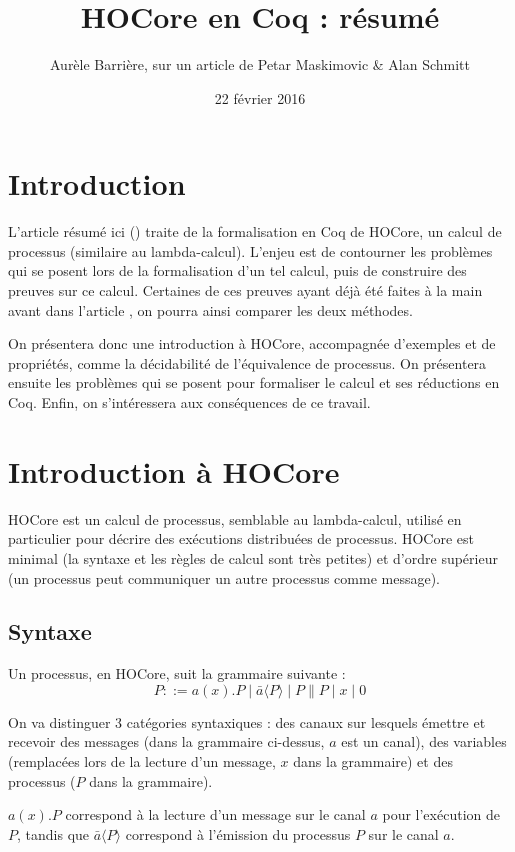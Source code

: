 \documentclass[11pt]{article}
\title{HOCore en Coq : résumé}
\date{22 février 2016}
\author{Aurèle Barrière, sur un article de Petar Maskimovic \& Alan Schmitt}
\begin{document}
\nocite{*}
\maketitle


\section{Introduction}
L'article résumé ici (\cite{hocoreincoq}) traite de la formalisation en Coq de HOCore, un calcul de processus (similaire au lambda-calcul). L'enjeu est de contourner les problèmes qui se posent lors de la formalisation d'un tel calcul, puis de construire des preuves sur ce calcul. Certaines de ces preuves ayant déjà été faites à la main avant dans l'article \cite{expressiveness}, on pourra ainsi comparer les deux méthodes.

On présentera donc une introduction à HOCore, accompagnée d'exemples et de propriétés, comme la décidabilité de l'équivalence de processus.
On présentera ensuite les problèmes qui se posent pour formaliser le calcul et ses réductions en Coq.
Enfin, on s'intéressera aux conséquences de ce travail.

\section{Introduction à HOCore}
HOCore est un calcul de processus, semblable au lambda-calcul, utilisé en particulier pour décrire des exécutions distribuées de processus. HOCore est minimal (la syntaxe et les règles de calcul sont très petites) et d'ordre supérieur (un processus peut communiquer un autre processus comme message). 


\subsection{Syntaxe}
Un processus, en HOCore, suit la grammaire suivante :
$$ P ::= a(x).P \mid \bar{a}\langle P\rangle \mid P\|P \mid x \mid 0 $$

On va distinguer 3 catégories syntaxiques : des canaux sur lesquels émettre et recevoir des messages (dans la grammaire ci-dessus, $a$ est un canal), des variables (remplacées lors de la lecture d'un message, $x$ dans la grammaire) et des processus ($P$ dans la grammaire).

$a(x).P$ correspond à la lecture d'un message sur le canal $a$ pour l'exécution de $P$, tandis que $\bar{a}\langle P\rangle$ correspond à l'émission du processus $P$ sur le canal $a$.
\end{document}
